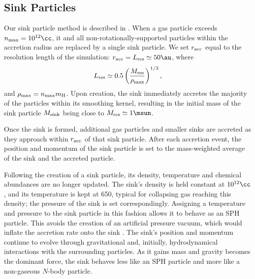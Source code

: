 \subsection{Sink Particles}
\label{sinkParticles}
Our sink particle method is described in \citet{StacyGreifBromm2010}. When a gas particle exceeds $n_{\rm max} = 10^{12}\cc$, it and all non-rotationally-supported particles within the accretion radius are replaced by a single sink particle.  We set $r_{\rm acc}$ equal to the resolution length of the simulation: $r_{\rm acc} = L_{\rm res} \simeq 50\au$, where 
\begin{equation}
L_{\rm res} \simeq 0.5 \left( \frac{M_{\rm res}}{\rho_{\rm max}} \right)^{1/3},
\end{equation}
and $\rho_{\rm max} = n_{\rm max} m_{\rm H}$.  Upon creation, the sink immediately accretes the majority of the particles within its smoothing kernel, resulting in the initial mass of the sink particle $M_{\rm sink}$ being close to $M_{\rm res} \simeq 1\msun$.

 Once the sink is formed, additional gas particles and smaller sinks are accreted as they approach within $r_{\rm acc}$ of that sink particle.  After each accretion event, the position and momentum of the sink particle is set to the mass-weighted average of the sink and the accreted particle.

Following the creation of a sink particle, its density, temperature and chemical abundances are no longer updated. The sink's density is held constant at $10^{12}\cc$, and its temperature is kept at 650\kelvin, typical for collapsing gas reaching this density; the pressure of the sink is set correspondingly. Assigning a temperature and pressure to the sink particle in this fashion allows it to behave as an SPH particle. This  avoids the creation of an artificial pressure vacuum, which would inflate the accretion rate onto the sink \citep[see][]{BrommCoppiLarson2002, MartelEvansShapiro2006}. The sink's position and momentum continue to evolve through gravitational and, initially, hydrodynamical interactions with the surrounding particles. As it gains mass and gravity becomes the dominant force, the sink behaves less like an SPH particle and more like a non-gaseous $N$-body particle.